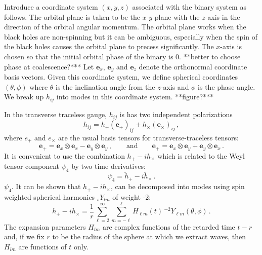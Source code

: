 \documentclass[amsmath,amssymb]{article}
\begin{document}
Introduce a coordinate system $(x,y,z)$ associated with the binary
system as follows.  The orbital plane is taken to be the $x$-$y$ plane
with the $z$-axis in the direction of the orbital angular momentum.
The orbital plane works when the black holes are non-spinning but it
can be ambiguous, especially when the spin of the black holes causes
the orbital plane to precess significantly.  The $x$-axis is chosen so
that the initial orbital phase of the binary is 0.  **better to choose
phase at coalescence?*** Let $\mathbf{e}_x$, $\mathbf{e}_y$ and
$\mathbf{e}_z$ denote the orthonormal coordinate basis vectors. Given
this coordinate system, we define spherical coordinates
$(\theta,\phi)$ where $\theta$ is the inclination angle from the
$z$-axis and $\phi$ is the phase angle. We break up $h_{ij}$ into
modes in this coordinate system. **figure?***

In the transverse traceless gauge, $h_{ij}$ is has two independent
polarizations 
\begin{equation}
  \label{eq:2}
  h_{ij} = h_+ (\mathbf{e}_+)_{ij} + h_\times (\mathbf{e}_\times)_{ij}\,,
\end{equation}
where $e_+$ and $e_\times$ are the usual basis tensors for
transverse-traceless tensors:
\begin{equation}
  \label{eq:9}
  \mathbf{e}_+ = \mathbf{e}_x\otimes\mathbf{e}_x -
  \mathbf{e}_y\otimes\mathbf{e}_y\,, \qquad \textrm{and} \qquad 
  \mathbf{e}_+ = \mathbf{e}_x\otimes\mathbf{e}_y + \mathbf{e}_y\otimes\mathbf{e}_x\,.
\end{equation}
It is convenient to use the combination $h_+ - ih_\times$ which is
related to the Weyl tensor component $\psi_4$ by two time derivatives:
\begin{equation}
  \label{eq:3}
  \psi_4 = \ddot{h}_+ -i\ddot{h}_\times\,.
\end{equation}
$\psi_4$. It can be shown that $h_+-ih_\times$, can be decomposed into
modes using spin weighted spherical harmonics ${}_sY_{lm}$ of weight
-2:
\begin{equation}
  \label{eq:4}
  h_+ - ih_\times = \frac{1}{r}\sum_{\ell=2}^{\infty}\sum_{m=-\ell}^\ell H_{\ell m}(t)\,
  {}^{-2}Y_{\ell m}(\theta,\phi)\,.
\end{equation}
The expansion parameters $H_{lm}$ are complex functions of the retarded time
$t-r$ and, if we fix $r$ to be the radius of the sphere at which we
extract waves, then $H_{lm}$ are functions of $t$ only.  
\end{document}
